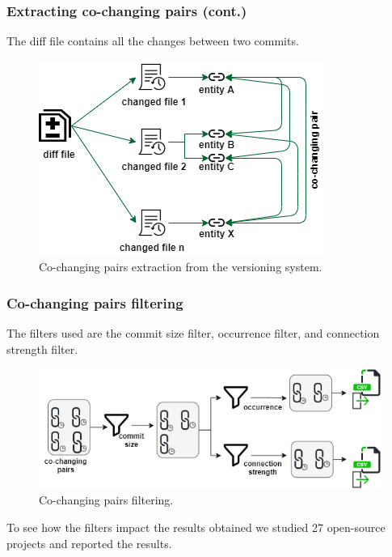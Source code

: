 \documentclass{beamer}
\begin{document}
 \begin{frame}
\frametitle{Extracting co-changing pairs (cont.)}
The diff file contains all the changes between two commits.
\begin{center}
     \begin{figure}
	\includegraphics[scale=0.65]{cochange_extract.png}
	\caption{\label{fig:fig1}Co-changing pairs extraction from the versioning system.}
     \end{figure}
\end{center}
\end{frame}

 \begin{frame}
\frametitle{Co-changing pairs filtering}
The filters used are the commit size filter, occurrence filter, and connection strength filter. 
\begin{center}
     \begin{figure}
	\includegraphics[width=\textwidth]{co-change_filtering.png}
	\caption{\label{fig:fig1}Co-changing pairs filtering.}
     \end{figure}
\end{center}
To see how the filters impact the results obtained we studied 27 open-source projects and reported the results.
\end{frame}

\end{document}
